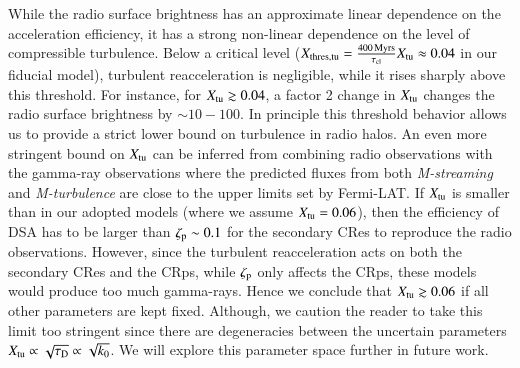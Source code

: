 \documentclass[a4paper,fleqn,usenatbib]{mnras}
\newcommand{\Mstream}{{\it M-streaming}\xspace}
\newcommand{\Mflatturb}{{\it M-turbulence}\xspace}
\begin{document}
While the radio surface brightness has an approximate linear
dependence on the acceleration efficiency, it has a strong non-linear
dependence on the level of compressible turbulence. Below a critical
level ($X_{\mathrm{thres,tu}} = \frac{400\,{\mathrm{Myrs}}}{\tau_{\mathrm{cl}}}
X_{\mathrm{tu}}\approx 0.04$ in our fiducial model), turbulent
reacceleration is negligible, while it rises sharply above this
threshold. For instance, for $X_{\mathrm{tu}}\gtrsim0.04$, a factor 2
change in $X_{\mathrm{tu}}$ changes the radio surface brightness by $\sim
10-100$. In principle this threshold behavior allows us to provide a
strict lower bound on turbulence in radio halos. An even more
stringent bound on $X_{\mathrm{tu}}$ can be inferred from combining radio
observations with the gamma-ray observations where the predicted
fluxes from both \Mstream and \Mflatturb are close to the upper limits
set by Fermi-LAT. If $X_{\mathrm{tu}}$ is smaller than in our adopted
models (where we assume $X_{\mathrm{tu}}=0.06$), then the efficiency of DSA
has to be larger than $\zeta_{\mathrm{p}}\sim 0.1$ for the secondary CRes
to reproduce the radio observations. However, since the turbulent
reacceleration acts on both the secondary CRes and the CRps, while
$\zeta_{\mathrm{p}}$ only affects the CRps, these models would produce too
much gamma-rays. Hence we conclude that $X_{\mathrm{tu}}\gtrsim0.06$ if all
other parameters are kept fixed. Although, we caution the reader to
take this limit too stringent since there are degeneracies between the
uncertain parameters $X_{\mathrm{tu}}\propto\sqrt{\tau_{\mathrm{D}}}\propto
\sqrt{k_0}$. We will explore this parameter space further in future
work.
\end{document}

